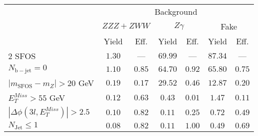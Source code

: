 \begin{tabular}{l||c|c||c|c||c|c}
\hline
 &       \multicolumn{6}{c}{Background} \\
 & \multicolumn{2}{c||}{$ZZZ+ZWW$} & \multicolumn{2}{c||}{$Z\gamma$} & \multicolumn{2}{c}{Fake} \\ 
 & Yield & Eff. & Yield & Eff. & Yield & Eff. \\
\hline\hline
2 SFOS &  $1.30$ &  --- &  $69.99$ &  --- &  $87.34$ &  --- \\ 
\hline
$N_{\mathrm{b-jet}}=0$ &  $1.10$ &  $0.85$ &  $64.70$ &  $0.92$ &  $65.80$ &  $0.75$ \\ 
\hline
$| m_{\mathrm{SFOS}} - m_Z | >  20$ GeV &  $0.19$ &  $0.17$ &  $29.52$ &  $0.46$ &  $12.87$ &  $0.20$ \\ 
\hline
$E_{T}^{Miss} > 55$ GeV &  $0.12$ &  $0.63$ &  $0.43$ &  $0.01$ &  $1.47$ &  $0.11$ \\ 
\hline
$|\Delta\phi(3l,E_{T}^{Miss})| > 2.5$ &  $0.10$ &  $0.82$ &  $0.11$ &  $0.25$ &  $0.72$ &  $0.49$ \\ 
\hline
$N_{\mathrm{Jet}} \leq 1$ &  $0.08$ &  $0.82$ &  $0.11$ &  $1.00$ &  $0.49$ &  $0.69$ \\ 
\hline
\end{tabular}

